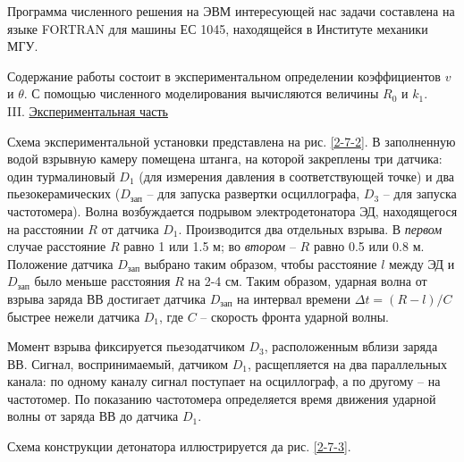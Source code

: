 \documentclass[specialist, subf, href, colorlinks=true, 14pt, final]{disser}
\theoremstyle{definition}
\newcommand{\npart}[2]{\noindent #1. \underline{#2}}
\begin{document}
Программа численного решения на ЭВМ интересующей нас задачи составлена на языке FORTRAN для машины ЕС 1045, находящейся в Институте механики МГУ.

Содержание работы состоит в экспериментальном определении коэффициентов $v$ и $\theta$. С помощью численного моделирования вычисляются величины $R_0$ и $k_1$.\\

\npart{III}{Экспериментальная часть}

Схема экспериментальной установки представлена на рис. \ref{2-7-2}. В заполненную водой взрывную камеру помещена штанга, на которой закреплены три датчика: один турмалиновый $D_1$ (для измерения давления в соответствующей точке) и два пьезокерамических ($D_{\text{зап}}$ -- для запуска развертки осциллографа, $D_3$ -- для запуска частотомера). Волна возбуждается подрывом электродетонатора ЭД, находящегося на расстоянии $R$ от датчика $D_1$. Производится два отдельных взрыва. В \textit{первом} случае расстояние $R$ равно 1 или 1.5 м; во \textit{втором} -- $R$ равно 0.5 или 0.8 м. Положение датчика $D_{\text{зап}}$ выбрано таким образом, чтобы расстояние $l$ между ЭД и $D_{\text{зап}}$ было меньше расстояния $R$ на 2-4 см. Таким образом, ударная волна от взрыва заряда ВВ достигает датчика $D_{\text{зап}}$ на интервал времени $\Delta t = (R - l) / C$ быстрее нежели датчика $D_1$, где $C$ -- скорость фронта ударной волны.

Момент взрыва фиксируется пьезодатчиком $D_3$, расположенным вблизи заряда ВВ. Сигнал, воспринимаемый, датчиком $D_1$, расщепляется на два параллельных канала: по одному каналу сигнал поступает на осциллограф, а по другому -- на частотомер. По показанию частотомера определяется время движения ударной волны от заряда ВВ до датчика $D_1$.

Схема конструкции детонатора иллюстрируется да рис. \ref{2-7-3}.
\end{document}
